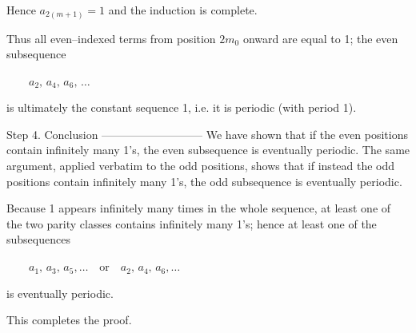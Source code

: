 Hence \(a_{2(m+1)}=1\) and the induction is complete.

Thus all even–indexed terms from position \(2m_0\) onward are equal to 1;
the even subsequence  

  \(a_2,\,a_4,\,a_6,\,\dots\)

is ultimately the constant sequence 1, i.e. it is periodic (with period 1).

Step 4.  Conclusion  
—————————  
We have shown that if the even positions contain infinitely many 1’s, the
even subsequence is eventually periodic.  
The same argument, applied verbatim to the odd positions, shows that
if instead the odd positions contain infinitely many 1’s, the odd
subsequence is eventually periodic.

Because 1 appears infinitely many times in the whole sequence,
at least one of the two parity classes contains infinitely many 1’s;
hence at least one of the subsequences  

  \(a_1,\,a_3,\,a_5,\dots\quad\text{or}\quad a_2,\,a_4,\,a_6,\dots\)

is eventually periodic.

This completes the proof.